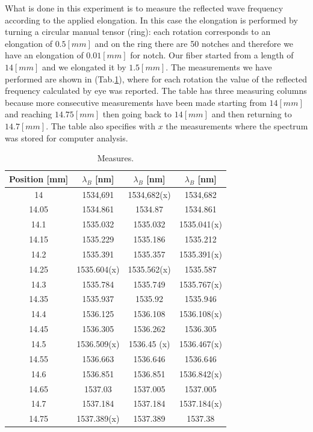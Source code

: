 What is done in this experiment is to measure the reflected wave frequency according to the applied elongation. In this case the elongation is performed by turning a circular manual tensor (ring): each rotation corresponds to an elongation of $0.5 [mm]$ and on the ring there are 50 notches and therefore we have an elongation of $0.01 [mm]$ for notch. Our fiber started from a length of $14 [mm]$ and we elongated it by $1.5 [mm]$. The measurements we have performed are shown in (Tab.\ref{table:measures}), where for each rotation the value of the reflected frequency calculated by eye was reported. The table has three measuring columns because more consecutive measurements have been made starting from $14 [mm]$ and reaching $14.75 [mm]$ then going back to $14 [mm]$ and then returning to $14.7 [mm]$. The table also specifies with $x$ the measurements where the spectrum was stored for computer analysis.
\begin{table}[h]
  \centering
  \begin{tabular}{c|c|c|c}
      Position [mm]  &  $\lambda_B$  [nm]  &  $\lambda_B$  [nm]  &  $\lambda_B$  [nm]  \\
      \hline
      14     &  1534,691     &  1534,682(x)  &  1534,682     \\
      14.05  &  1534.861     &  1534.87      &  1534.861     \\
      14.1   &  1535.032     &  1535.032     &  1535.041(x)  \\
      14.15  &  1535.229     &  1535.186     &  1535.212     \\
      14.2   &  1535.391     &  1535.357     &  1535.391(x)  \\
      14.25  &  1535.604(x)  &  1535.562(x)  &  1535.587     \\
      14.3   &  1535.784     &  1535.749     &  1535.767(x)  \\
      14.35  &  1535.937     &  1535.92      &  1535.946     \\
      14.4   &  1536.125     &  1536.108     &  1536.108(x)  \\
      14.45  &  1536.305     &  1536.262     &  1536.305     \\
      14.5   &  1536.509(x)  &  1536.45 (x)  &  1536.467(x)  \\
      14.55  &  1536.663     &  1536.646     &  1536.646     \\
      14.6   &  1536.851     &  1536.851     &  1536.842(x)  \\
      14.65  &  1537.03      &  1537.005     &  1537.005     \\
      14.7   &  1537.184     &  1537.184     &  1537.184(x)  \\
      14.75  &  1537.389(x)  &  1537.389     &  1537.38      \\

  \end{tabular}
  \caption{Measures.}
  \label{table:measures}
\end{table}
